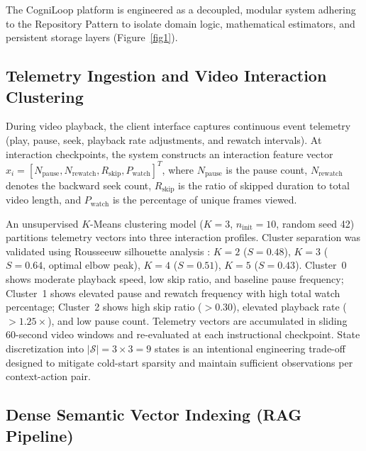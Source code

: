 \documentclass[pdflatex,sn-apa]{sn-jnl}
\begin{document}
The CogniLoop platform is engineered as a decoupled, modular system adhering to the Repository Pattern to isolate domain logic, mathematical estimators, and persistent storage layers (Figure~\ref{fig1}).

\subsection{Telemetry Ingestion and Video Interaction Clustering}\label{sec3.1}

During video playback, the client interface captures continuous event telemetry (play, pause, seek, playback rate adjustments, and rewatch intervals). At interaction checkpoints, the system constructs an interaction feature vector $x_i = [N_{\text{pause}}, N_{\text{rewatch}}, R_{\text{skip}}, P_{\text{watch}}]^T$, where $N_{\text{pause}}$ is the pause count, $N_{\text{rewatch}}$ denotes the backward seek count, $R_{\text{skip}}$ is the ratio of skipped duration to total video length, and $P_{\text{watch}}$ is the percentage of unique frames viewed.

An unsupervised $K$-Means clustering model ($K=3$, $n_{\text{init}}=10$, random seed 42) partitions telemetry vectors into three interaction profiles. Cluster separation was validated using Rousseeuw silhouette analysis \citep{rousseeuw1987silhouettes}: $K=2$ ($S=0.48$), $K=3$ ($S=0.64$, optimal elbow peak), $K=4$ ($S=0.51$), $K=5$ ($S=0.43$). Cluster~0 shows moderate playback speed, low skip ratio, and baseline pause frequency; Cluster~1 shows elevated pause and rewatch frequency with high total watch percentage; Cluster~2 shows high skip ratio ($>0.30$), elevated playback rate ($>1.25\times$), and low pause count. Telemetry vectors are accumulated in sliding 60-second video windows and re-evaluated at each instructional checkpoint. State discretization into $|\mathcal{S}|=3\times3=9$ states is an intentional engineering trade-off designed to mitigate cold-start sparsity and maintain sufficient observations per context-action pair.

\subsection{Dense Semantic Vector Indexing (RAG Pipeline)}\label{sec3.2}
\end{document}

